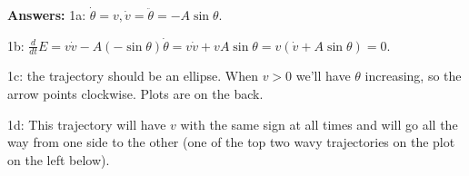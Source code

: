 \documentclass[12pt,letterpaper,noanswers]{exam}
\begin{document}
\begin{questions}






\end{questions}

\textbf{Answers:} 
1a: $\dot{\theta} = v, \dot{v} = \ddot{\theta} = -A\sin\theta$. 

1b: $\frac{d}{dt}E = v \dot{v} -A(-\sin\theta)\dot{\theta} = v\dot{v} + vA\sin\theta = v(\dot{v} + A\sin\theta) = 0.$

1c: the trajectory should be an ellipse.  When $v>0$ we'll have $\theta$ increasing, so the arrow points clockwise.  Plots are on the back.

1d: This trajectory will have $v$ with the same sign at all times and will go all the way from one side to the other (one of the top two wavy trajectories on the plot on the left below).
\eject 
\end{document}
